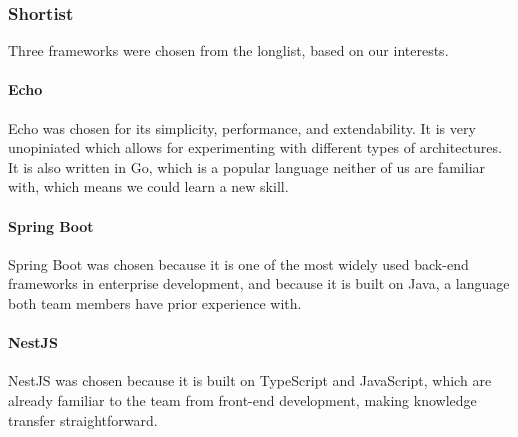 \subsubsection{Shortist}
Three frameworks were chosen from the longlist, based on our interests.

\paragraph{Echo}
Echo was chosen for its simplicity, performance, and extendability.
It is very unopiniated which allows for experimenting with different types of architectures.
It is also written in Go, which is a popular language neither of us are familiar with, which means we could learn a new skill.

\paragraph{Spring Boot}
Spring Boot was chosen because it is one of the most widely used back-end frameworks in enterprise development, and because it is built on Java, a language both team members have prior experience with.

\paragraph{NestJS}
NestJS was chosen because it is built on TypeScript and JavaScript, which are already familiar to the team from front-end development, making knowledge transfer straightforward.
